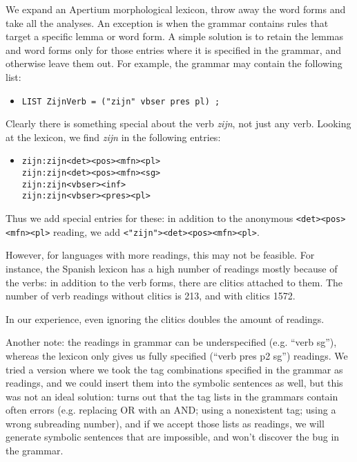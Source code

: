 We expand an Apertium morphological lexicon, throw away the word forms and take all the analyses. An exception is when the grammar contains rules that target a specific lemma or word form.
A simple solution is to retain the lemmas and word forms only for those entries where it is specified in the grammar, and otherwise leave them out. For example, the grammar may contain the following list:

\begin{itemize}
 \item[] \texttt{LIST ZijnVerb = ("zijn" vbser pres pl) ;}
\end{itemize}

Clearly there is something special about the verb \emph{zijn}, not just any verb. Looking at the lexicon, we find \emph{zijn} in the following entries:

\begin{itemize}
 \item[] \begin{verbatim}zijn:zijn<det><pos><mfn><pl>
zijn:zijn<det><pos><mfn><sg>
zijn:zijn<vbser><inf>
zijn:zijn<vbser><pres><pl>
\end{verbatim}
\end{itemize}

Thus we add special entries for these: in addition to the anonymous
 \texttt{<det><pos><mfn><pl>} reading, we add \texttt{<"zijn"><det><pos><mfn><pl>}.

 However, for languages with more readings, this may not be feasible. For instance, the Spanish lexicon has a high number of readings mostly because of the verbs: in addition to the verb forms, there are clitics attached to them. The number of verb readings without clitics is 213, and with clitics 1572.

 In our experience,  even ignoring the clitics doubles the amount of readings.

Another note: the readings in grammar can be underspecified (e.g. ``verb sg''), whereas the lexicon only gives us fully specified (``verb pres p2 sg'') readings.  We tried a version where we took the tag combinations specified in the grammar as readings, and we could insert them into the symbolic sentences as well, but this was not an ideal solution: turns out that the tag lists in the grammars contain often errors (e.g. replacing OR with an AND; using a nonexistent tag; using a wrong subreading number), and if we accept those lists as readings, we will generate symbolic sentences that are impossible, and won't discover the bug in the grammar.

